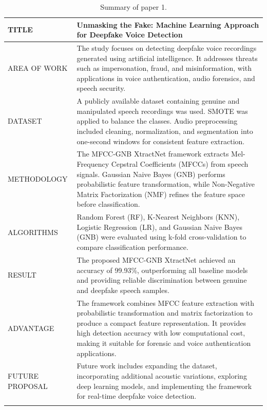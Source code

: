 \documentclass[12pt,a4paper]{report}
\begin{document}
\begin{longtable}{|p{4cm}|p{11cm}|}
\hline

TITLE &
Unmasking the Fake: Machine Learning Approach for Deepfake Voice Detection \\ \hline

AREA OF WORK &
The study focuses on detecting deepfake voice recordings generated using artificial intelligence. It addresses threats such as impersonation, fraud, and misinformation, with applications in voice authentication, audio forensics, and speech security. \\ \hline

DATASET &
A publicly available dataset containing genuine and manipulated speech recordings was used. SMOTE was applied to balance the classes. Audio preprocessing included cleaning, normalization, and segmentation into one-second windows for consistent feature extraction. \\ \hline

METHODOLOGY &
The MFCC-GNB XtractNet framework extracts Mel-Frequency Cepstral Coefficients (MFCCs) from speech signals. Gaussian Naive Bayes (GNB) performs probabilistic feature transformation, while Non-Negative Matrix Factorization (NMF) refines the feature space before classification. \\ \hline

ALGORITHMS &
Random Forest (RF), K-Nearest Neighbors (KNN), Logistic Regression (LR), and Gaussian Naive Bayes (GNB) were evaluated using k-fold cross-validation to compare classification performance. \\ \hline

RESULT &
The proposed MFCC-GNB XtractNet achieved an accuracy of 99.93\%, outperforming all baseline models and providing reliable discrimination between genuine and deepfake speech samples. \\ \hline

ADVANTAGE &
The framework combines MFCC feature extraction with probabilistic transformation and matrix factorization to produce a compact feature representation. It provides high detection accuracy with low computational cost, making it suitable for forensic and voice authentication applications. \\ \hline

FUTURE PROPOSAL &
Future work includes expanding the dataset, incorporating additional acoustic variations, exploring deep learning models, and implementing the framework for real-time deepfake voice detection. \\ \hline

\caption[Summary of paper 1]{Summary of paper 1.}
\label{tab:paper_summary}

\end{longtable}
\end{document}
